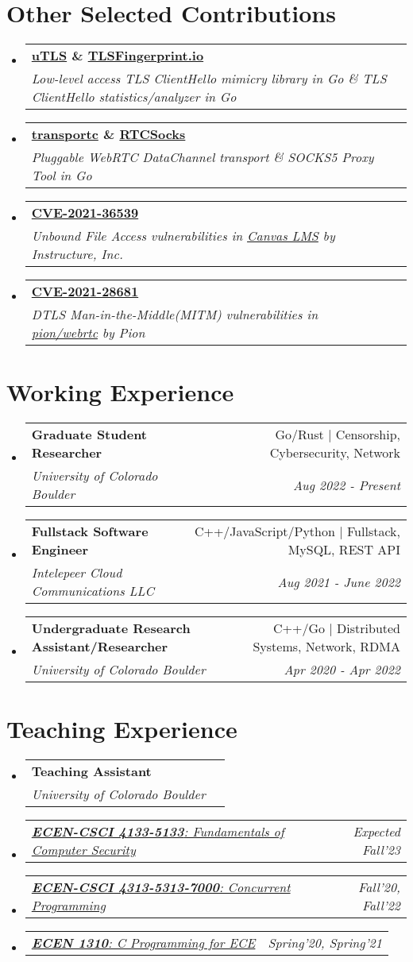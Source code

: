 \documentclass[letterpaper,11pt]{article}
\makeatletter
\newcommand{\resumeSubheading}[4]{
  \vspace{-2pt}\item
    \begin{tabular*}{0.97\textwidth}[t]{l@{\extracolsep{\fill}}r}
      \textbf{#1} & #2 \\
      \textit{\small#3} & \textit{\small #4} \\
    \end{tabular*}\vspace{-7pt}
}
\newcommand{\resumeSubSubheading}[2]{
    \item
    \begin{tabular*}{0.97\textwidth}{l@{\extracolsep{\fill}}r}
      \textit{\small#1} & \textit{\small #2} \\
    \end{tabular*}\vspace{-7pt}
}
\newcommand{\resumeSubHeadingListStart}{\begin{itemize}[leftmargin=0.15in, label={}]}
\newcommand{\resumeSubHeadingListEnd}{\end{itemize}}
\makeatother
\begin{document}
\section{Other Selected Contributions}
\resumeSubHeadingListStart
\resumeSubheading
{\href{https://github.com/refraction-networking/utls}{\textbf{uTLS}} \& \href{https://github.com/refraction-networking/tls-fingerprint}{\textbf{TLSFingerprint.io}}}{}
{Low-level access TLS ClientHello mimicry library in Go \& TLS ClientHello statistics/analyzer in Go}{}
\resumeSubheading
{\href{https://github.com/gaukas/transportc}{\textbf{transportc}} \& \href{https://github.com/gaukas/rtcsocks}{\textbf{RTCSocks}}}{}
{Pluggable WebRTC DataChannel transport \& SOCKS5 Proxy Tool in Go}{}
\resumeSubheading
{\href{https://cve.mitre.org/cgi-bin/cvename.cgi?name=CVE-2021-36539}{\textbf{CVE-2021-36539}}}{}
{Unbound File Access vulnerabilities in \href{https://www.instructure.com/canvas}{Canvas LMS} by \emph{Instructure, Inc.}}{}
\resumeSubheading
{\href{https://cve.mitre.org/cgi-bin/cvename.cgi?name=CVE-2021-28681}{\textbf{CVE-2021-28681}}}{}
{DTLS Man-in-the-Middle(MITM) vulnerabilities in \href{https://github.com/pion/webrtc}{pion/webrtc} by \emph{Pion}}{}
\resumeSubHeadingListEnd
\vspace{1pt}

\section{Working Experience}
\resumeSubHeadingListStart
\resumeSubheading
{Graduate Student Researcher}{Go/Rust $|$ Censorship, Cybersecurity, Network}
{University of Colorado Boulder}{Aug 2022 - Present}
\resumeSubheading
{Fullstack Software Engineer}{C++/JavaScript/Python $|$ Fullstack, MySQL, REST API}
{Intelepeer Cloud Communications LLC}{Aug 2021 - June 2022}
\resumeSubheading
{Undergraduate Research Assistant/Researcher}{C++/Go $|$ Distributed Systems, Network, RDMA}
{University of Colorado Boulder}{Apr 2020 - Apr 2022}
\resumeSubHeadingListEnd
\vspace{1pt}

\section{Teaching Experience}
\resumeSubHeadingListStart
\resumeSubheading
{Teaching Assistant}{}
{University of Colorado Boulder}{}
\resumeSubSubheading
{\href{https://experts.colorado.edu/display/coursename_ECEN-4133}{\textbf{ECEN-CSCI 4133-5133}: Fundamentals of Computer Security}}{Expected Fall'23}
\resumeSubSubheading
{\href{https://experts.colorado.edu/display/coursename_ECEN-4313}{\textbf{ECEN-CSCI 4313-5313-7000}: Concurrent Programming}}{Fall'20, Fall'22}
\resumeSubSubheading
{\href{https://experts.colorado.edu/display/coursename_ECEN-1310}{\textbf{ECEN 1310}: C Programming for ECE}}{Spring'20, Spring'21}\resumeSubHeadingListEnd
\vspace{1pt}
\end{document}
